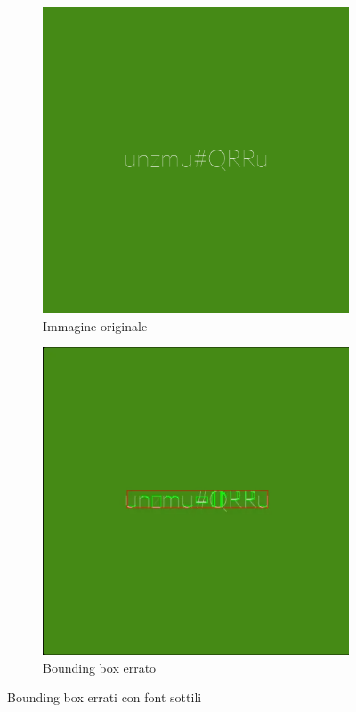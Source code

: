 \begin{figure}[htbp]
    \centering
    \begin{subfigure}[t]{0.45\textwidth}
        \centering
        \includegraphics[width=\textwidth]{images/thin_font1.png}
        \caption{Immagine originale}
    \end{subfigure}
    \hfill
    \begin{subfigure}[t]{0.45\textwidth}
        \centering
        \includegraphics[width=\textwidth]{images/thin_font1_preproc.png}
        \caption{Bounding box errato}
    \end{subfigure}

    \caption{Bounding box errati con font sottili}
    \label{fig:thin_fonts_bboxes}
\end{figure}

